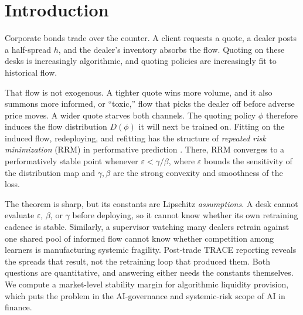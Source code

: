 \documentclass[sigconf,anonymous,review]{acmart}
\newcommand{\eps}{\varepsilon}
\begin{document}

\maketitle

\section{Introduction}

Corporate bonds trade over the counter. A client requests a quote, a dealer
posts a half-spread $h$, and the dealer's inventory absorbs the flow. Quoting
on these desks is increasingly algorithmic, and quoting policies are
increasingly fit to historical flow.

That flow is not exogenous. A tighter quote wins more volume, and it also
summons more informed, or ``toxic,'' flow that picks the dealer off before
adverse price moves. A wider quote starves both channels. The quoting policy
$\phi$ therefore induces the flow distribution $D(\phi)$ it will next be
trained on. Fitting on the induced flow, redeploying, and refitting has the
structure of \emph{repeated risk minimization} (RRM) in performative
prediction \cite{perdomo2020performative}. There, RRM converges to a
performatively stable point whenever $\eps<\gamma/\beta$, where $\eps$ bounds
the sensitivity of the distribution map and $\gamma,\beta$ are the strong
convexity and smoothness of the loss.

The theorem is sharp, but its constants are Lipschitz \emph{assumptions}. A
desk cannot evaluate $\eps$, $\beta$, or $\gamma$ before deploying, so it
cannot know whether its own retraining cadence is stable. Similarly, a
supervisor watching many dealers retrain against one shared pool of informed
flow cannot know whether competition among learners is manufacturing systemic
fragility. Post-trade TRACE reporting reveals the spreads that result, not
the retraining loop that produced them. Both questions are quantitative, and
answering either needs the constants themselves. We compute a market-level
stability margin for algorithmic liquidity provision, which puts the problem
in the AI-governance and systemic-risk scope of AI in finance.
\end{document}
